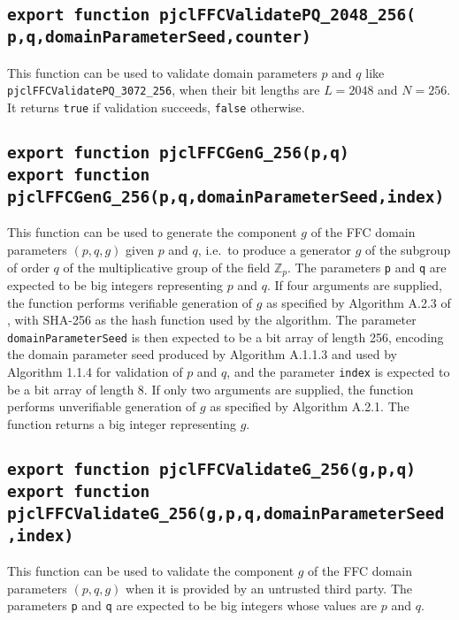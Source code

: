 \documentclass[12pt]{article}
\begin{document}
\subsection{\tt export function pjclFFCValidatePQ\_2048\_256(\\\mbox{}\hspace{.2in}p,q,domainParameterSeed,counter)}

This function can be used to validate domain parameters $p$ and $q$ like
{\tt pjclFFCValidatePQ\_3072\_256}, when their bit lengths are $L=2048$ and $N=256$.
It returns {\tt true} if validation succeeds, {\tt false} otherwise.

\subsection{\tt export function pjclFFCGenG\_256(p,q)\\export function pjclFFCGenG\_256(p,q,domainParameterSeed,index)}

This function can be used to generate the component $g$ of the FFC domain parameters $(p,q,g)$
given $p$ and $q$, i.e.\ to produce a generator $g$ of the subgroup of order $q$ of the
multiplicative group of the field $\mathbb{Z}_p$.  The parameters {\tt p} and {\tt q} are expected
to be big integers representing $p$ and $q$.  If four arguments are supplied, the function
performs verifiable generation of $g$ as specified by Algorithm A.2.3 of \cite{DSS-4},
with SHA-256 as the hash function used by the algorithm. 
The parameter {\tt domainParameterSeed} is then expected to be a bit array of length 256, 
encoding the domain parameter seed produced by Algorithm A.1.1.3 and used by Algorithm 1.1.4
for validation of $p$ and $q$, and the parameter {\tt index}
is expected to be a bit array of length 8.
If only two arguments are supplied, the function performs unverifiable generation of $g$
as specified by Algorithm A.2.1.
The function returns a big integer representing $g$.

\subsection{\tt export function pjclFFCValidateG\_256(g,p,q)\\export function pjclFFCValidateG\_256(g,p,q,domainParameterSeed,index)}

This function can be used to validate the component $g$ of the FFC domain parameters $(p,q,g)$
when it is provided by an untrusted third party.
The parameters {\tt p} and {\tt q} are expected to be big integers whose values are $p$ and $q$.
\end{document}

